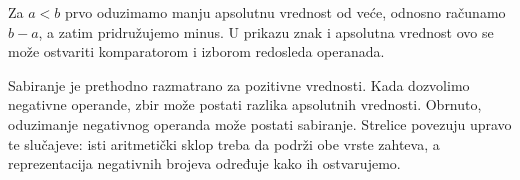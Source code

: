 Za $a<b$ prvo oduzimamo manju apsolutnu vrednost od veće, odnosno računamo $b-a$, a zatim pridružujemo minus. U prikazu znak i apsolutna vrednost ovo se može ostvariti komparatorom i izborom redosleda operanada.

Sabiranje je prethodno razmatrano za pozitivne vrednosti. Kada dozvolimo negativne operande, zbir može postati razlika apsolutnih vrednosti. Obrnuto, oduzimanje negativnog operanda može postati sabiranje. Strelice povezuju upravo te slučajeve: isti aritmetički sklop treba da podrži obe vrste zahteva, a reprezentacija negativnih brojeva određuje kako ih ostvarujemo.
